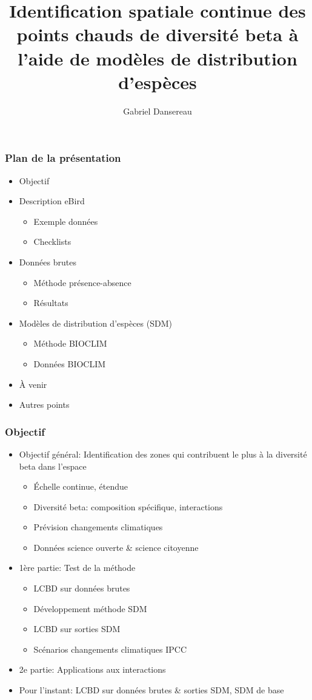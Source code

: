 \documentclass[10pt]{beamer}
\title{Identification spatiale continue des points chauds de diversité beta à l'aide de modèles de distribution d'espèces}
\author{Gabriel Dansereau}
\begin{document}
\begin{frame}
  \titlepage
\end{frame}

\begin{frame}
  \frametitle{Plan de la présentation}
  \begin{itemize}
    \item Objectif
    \item Description eBird
    \begin{itemize}
      \item Exemple données
      \item Checklists
    \end{itemize}
    \item Données brutes
    \begin{itemize}
      \item Méthode présence-absence
      \item Résultats
    \end{itemize}
    \item Modèles de distribution d'espèces (SDM)
    \begin{itemize}
      \item Méthode BIOCLIM
      \item Données BIOCLIM
    \end{itemize}
    \item À venir
    \item Autres points
  \end{itemize}
\end{frame}

\begin{frame}
  \frametitle{Objectif}
  \begin{itemize}
    \item Objectif général: Identification des zones qui contribuent le plus à la diversité beta dans l'espace
    \begin{itemize}
      \item Échelle continue, étendue
      \item Diversité beta: composition spécifique, interactions
      \item Prévision changements climatiques
      \item Données science ouverte & science citoyenne
    \end{itemize}
    \smallskip
    \item 1ère partie: Test de la méthode
    \begin{itemize}
      \item LCBD sur données brutes
      \item Développement méthode SDM
      \item LCBD sur sorties SDM
      \item Scénarios changements climatiques IPCC
    \end{itemize}
    \item 2e partie: Applications aux interactions
    \smallskip
    \item Pour l'instant: LCBD sur données brutes & sorties SDM, SDM de base
  \end{itemize}
\end{frame}
\end{document}
